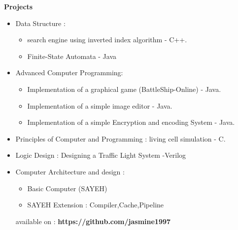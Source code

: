 \documentclass[a4paper,12pt,final]{memoir}
\newcommand{\Sep}{\vspace{1.5em}}
\newcommand{\SmallSep}{\vspace{0.5em}}
\newcommand{\CVSection}[1]
	{\Large\textbf{#1}\par
	\SmallSep\normalsize\normalfont}
\newcommand{\CVItem}[1]
	{\textbf{\color{RoyalBlue} #1}}
\begin{document}
\Sep 

\CVSection{Projects}
\begin{itemize}
	\item Data Structure :
		\begin{itemize}[$\circ$]
		\item	search engine using inverted index algorithm - C++.
	     \item   Finite-State Automata - Java
		\end{itemize}
		
	\item Advanced Computer Programming:
		\begin{itemize}[$\circ$]
		\item  Implementation of a graphical game (BattleShip-Online) - Java.
     	\item Implementation of a simple image editor - Java.
	    \item Implementation of a simple Encryption and encoding System  - Java.
		\end{itemize}
		
	\item Principles of Computer and Programming : 
	living cell simulation - C.
   	\item Logic Design : 
   	Designing a Traffic Light System -Verilog
   	\item Computer Architecture and design :
   		\begin{itemize}[$\circ$]
		\item Basic Computer (SAYEH)
		\item SAYEH Extension : Compiler,Cache,Pipeline
		\end{itemize}
		

	available on :
  \CVItem {  https://github.com/jasmine1997}
 	
\end{itemize}

\Sep
\end{document}

